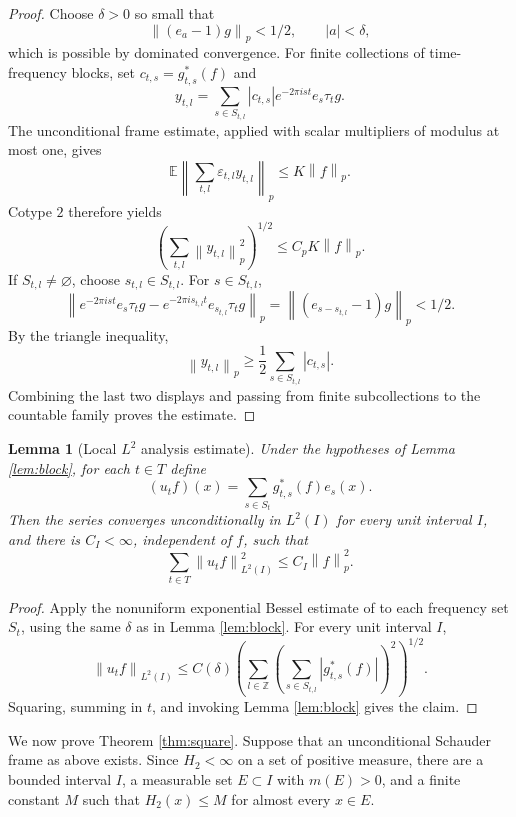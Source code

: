 \documentclass[11pt]{article}
\newtheorem{lemma}{Lemma}
\newcommand{\TT}{T}
\newcommand{\SSS}{S}
\newcommand{\norm}[1]{\left\lVert #1 \right\rVert}
\begin{document}
\begin{proof}
Choose \(\delta>0\) so small that
\[
  \norm{(e_a-1)g}_p<1/2,\qquad |a|<\delta,
\]
which is possible by dominated convergence.  For finite collections of
time-frequency blocks, set \(c_{t,s}=g^*_{t,s}(f)\) and
\[
  y_{t,l}=\sum_{s\in\SSS_{t,l}}
    |c_{t,s}|e^{-2\pi i st}e_s\tau_tg .
\]
The unconditional frame estimate, applied with scalar multipliers of modulus
at most one, gives
\[
  \mathbb E\norm{\sum_{t,l}\varepsilon_{t,l}y_{t,l}}_p
  \le K\norm{f}_p .
\]
Cotype \(2\) therefore yields
\[
  \left(\sum_{t,l}\norm{y_{t,l}}_p^2\right)^{1/2}
  \le C_pK\norm{f}_p .
\]
If \(\SSS_{t,l}\ne\varnothing\), choose \(s_{t,l}\in\SSS_{t,l}\).  For
\(s\in\SSS_{t,l}\),
\[
 \norm{e^{-2\pi i st}e_s\tau_tg
      -e^{-2\pi i s_{t,l}t}e_{s_{t,l}}\tau_tg}_p
 =\norm{(e_{s-s_{t,l}}-1)g}_p<1/2.
\]
By the triangle inequality,
\[
  \norm{y_{t,l}}_p
  \ge \frac12\sum_{s\in\SSS_{t,l}} |c_{t,s}|.
\]
Combining the last two displays and passing from finite subcollections to the
countable family proves the estimate.
\end{proof}

\begin{lemma}[Local \(L^2\) analysis estimate]
\label{lem:local}
Under the hypotheses of Lemma \ref{lem:block}, for each \(t\in\TT\) define
\[
  (u_t f)(x)=\sum_{s\in\SSS_t}g^*_{t,s}(f)e_s(x).
\]
Then the series converges unconditionally in \(L^2(I)\) for every unit interval
\(I\), and there is \(C_I<\infty\), independent of \(f\), such that
\[
  \sum_{t\in\TT}\norm{u_tf}_{L^2(I)}^2\le C_I\norm{f}_p^2 .
\]
\end{lemma}

\begin{proof}
Apply the nonuniform exponential Bessel estimate of \cite[Lemma 3.7]{LTGabor}
to each frequency set \(\SSS_t\), using the same \(\delta\) as in Lemma
\ref{lem:block}.  For every unit interval \(I\),
\[
  \norm{u_tf}_{L^2(I)}
  \le C(\delta)
  \left(\sum_{l\in\mathbb Z}
    \left(\sum_{s\in\SSS_{t,l}} |g^*_{t,s}(f)|\right)^2
  \right)^{1/2}.
\]
Squaring, summing in \(t\), and invoking Lemma \ref{lem:block} gives the
claim.
\end{proof}

We now prove Theorem \ref{thm:square}.  Suppose that an unconditional
Schauder frame as above exists.  Since \(H_2<\infty\) on a set of positive
measure, there are a bounded interval \(I\), a measurable set \(E\subset I\)
with \(m(E)>0\), and a finite constant \(M\) such that \(H_2(x)\le M\) for
almost every \(x\in E\).
\end{document}
